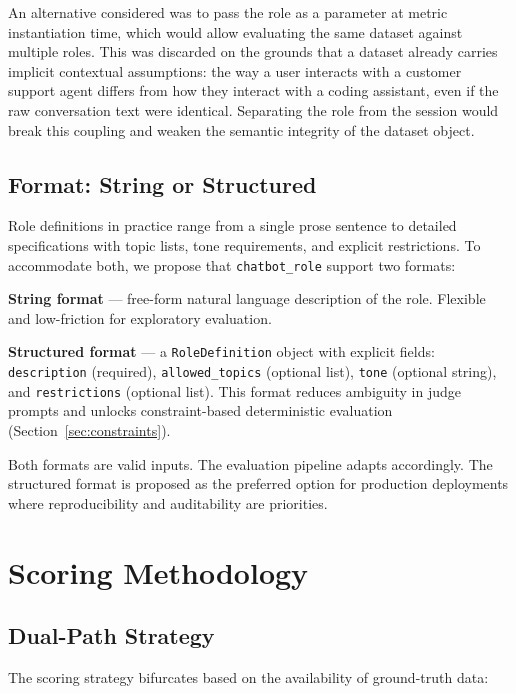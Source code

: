 \documentclass[11pt,a4paper]{article}
\begin{document}
An alternative considered was to pass the role as a parameter at metric
instantiation time, which would allow evaluating the same dataset against
multiple roles. This was discarded on the grounds that a dataset already
carries implicit contextual assumptions: the way a user interacts with a
customer support agent differs from how they interact with a coding assistant,
even if the raw conversation text were identical. Separating the role from the
session would break this coupling and weaken the semantic integrity of the
dataset object.

\subsection{Format: String or Structured}

Role definitions in practice range from a single prose sentence to detailed
specifications with topic lists, tone requirements, and explicit restrictions.
To accommodate both, we propose that \texttt{chatbot\_role} support two
formats:

\textbf{String format} --- free-form natural language description of the role.
Flexible and low-friction for exploratory evaluation.

\textbf{Structured format} --- a \texttt{RoleDefinition} object with explicit
fields: \texttt{description} (required), \texttt{allowed\_topics} (optional
list), \texttt{tone} (optional string), and \texttt{restrictions} (optional
list). This format reduces ambiguity in judge prompts and unlocks
constraint-based deterministic evaluation (Section~\ref{sec:constraints}).

Both formats are valid inputs. The evaluation pipeline adapts accordingly. The
structured format is proposed as the preferred option for production
deployments where reproducibility and auditability are priorities.

\section{Scoring Methodology}
\label{sec:scoring}

\subsection{Dual-Path Strategy}

The scoring strategy bifurcates based on the availability of ground-truth
data:
\end{document}

